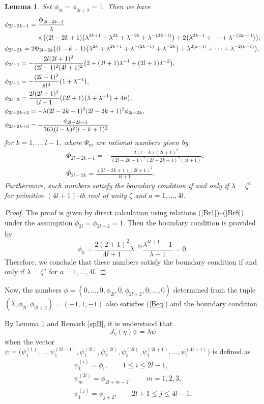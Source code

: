 \documentclass[pdftex]{sigma}
\numberwithin{equation}{section}
\newtheorem{Lemma}[Theorem]{Lemma}
\begin{document}
		\begin{Lemma}\label{B}
		Set $\phi_{2l}=\phi_{2l+2}=1$.
		Then we have
			\begin{align*}
	&\phi_{2l-2k-1}=\frac{\Phi_{2l-2k-1}}{\lambda}\\
&\hphantom{\phi_{2l-2k-1}=}{}\times\!\bigl((2l-2k+1)\bigl(\lambda^{2k+1}+\lambda^{2k}+\lambda^{-2k}+\lambda^{-(2k+1)}\bigr) +2\bigl(\lambda^{2k-1}+\cdots+\lambda^{-(2k-1)}\bigr)\bigr),\\ &\phi_{2l-2k}=2\Phi_{2l-2k}\bigl((l-k+1)\bigl(\lambda^{2k}+\lambda^{2k-1}+\lambda^{-(2k-1)}+\lambda^{-2k}\bigr)+\lambda^{2(k-1)}+\cdots+\lambda^{-2(k-1)}\bigr),\\
			&\phi_{2l-1}=-\frac{2l(2l+1)^2}{(2l-1)^2(4l+1)^2}\bigl(2+(2l+1)\lambda^{-1}+(2l+1)\lambda^{-2}\bigr),\\
			&\phi_{2l+1}=-\frac{(2l+1)^3}{8l^3}\bigl(1+\lambda^{-1}\bigr),\\
			&\phi_{2l+3}=\frac{2l(2l+1)^2}{4l+1}\bigl((2l+1)\bigl(\lambda+\lambda^{-1}\bigr)+4n\bigr),\\
			&\phi_{2l+2k+2}=-\lambda(2l-2k-1)^2(2l-2k+1)^2\phi_{2l-2k},\\
			&\phi_{2l+2k+3}=-\frac{\phi_{2l-2k-1}}{16\lambda(l-k)^2(l-k+1)^2}
			\end{align*}
		for $k=1,\dots,l-1$, where $\Psi_m$ are rational numbers given by
			\begin{align*}
			&\Phi_{2l-2k-1}=-\frac{2(l-k)(2l+1)^2}{(2l-2k-1)^2(2l-2k+1)^2(4l+1)},\\
			&\Phi_{2l-2k}=\frac{(2l-2k+1)(2l+1)^2}{4l+1}.			
			\end{align*}
		Furthermore, such numbers satisfy the boundary condition if and only if $\lambda=\zeta^a$ for primitive $(4l+1)$-th root of unity $\zeta$ and $a=1,\dots,4l$.
		\end{Lemma}
		\begin{proof}
		The proof is given by direct calculation using relations (\ref{Br1})--(\ref{Br8}) under the assumption $\phi_{2l}=\phi_{2l+2}=1$.
		Then the boundary condition is provided by
			\[\phi_0=\frac{2(2+1)^2}{4l+1}\lambda^{-2l}\frac{\lambda^{4l+1}-1}{\lambda-1}=0.\]
		Therefore, we conclude that these numbers satisfy the boundary condition if and only if $\lambda=\zeta^a$ for $a=1,\dots,4l$.
		\end{proof}
		\begin{Remark}\label{spB}
		Now, the numbers $\phi=(0,\dots,0,\phi_{2l},0,\phi_{2l+2},0,\dots,0)$ determined from the tuple $(\lambda,\phi_{2l},\phi_{2l+2})=(-1,1,-1)$ also satisfies (\ref{Beq}) and the boundary condition.
		\end{Remark}
By Lemma \ref{B} and Remark \ref{spB}, it is understood that
	\[J_\gamma(\eta)\psi=\lambda\psi\]
when the vector $\psi=\bigl(\psi_1^{(1)},\dots,\psi_1^{(2l-1)},\psi_1^{(2l)},\psi_2^{(2l)},\psi_3^{(2l)},\psi_1^{(2l+1)},\dots,\psi_1^{(4l-1)}\bigr)$ is defined as
	\begin{gather*}
 \psi_1^{(i)}=\phi_i,\qquad 1\leq i\leq 2l-1,\\
 \psi_m^{(2l)}=\phi_{2l+m-1},\qquad m=1,2,3,\\
 \psi_1^{(j)}=\phi_{j+2},\qquad 2l+1\leq j\leq 4l-1.
 \end{gather*}
\end{document}
